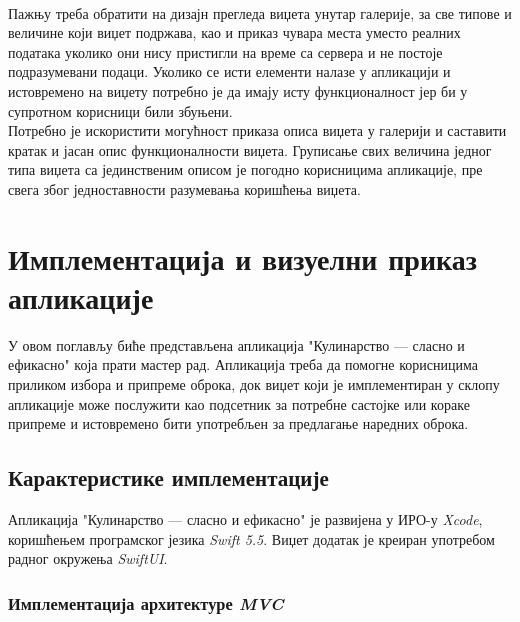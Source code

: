 \documentclass[12pt,oneside]{memoir}
\begin{document}
\\
\indent Пажњу треба обратити на дизајн прегледа виџета унутар галерије, за све типове и величине који виџет подржава, као и приказ чувара места уместо реалних података уколико они нису пристигли на време са сервера и не постоје подразумевани подаци. Уколико се исти елементи налазе у апликацији и истовремено на виџету потребно је да имају исту функционалност јер би у супротном корисници били збуњени. 
\\
\indent Потребно је искористити могућност приказа описа виџета у галерији и саставити кратак и јасан опис функционалности виџета. Груписање свих величина једног типа виџета са јединственим описом је погодно корисницима апликације, пре свега због једноставности разумевања коришћења виџета.

\chapter{Имплементација и визуелни приказ апликације}

\indent У овом поглављу биће представљена апликација "Кулинарство --- сласно и ефикасно" која прати мастер рад. Апликација треба да помогне корисницима приликом избора и припреме оброка, док виџет који је имплементиран у склопу апликације може послужити као подсетник за потребне састојке или кораке припреме и истовремено бити употребљен за предлагање наредних оброка.

\section{Карактеристике имплементације}

\indent Апликација "Кулинарство --- сласно и ефикасно" је развијена у ИРО-у \textit{Xcode}, коришћењем програмског језика \textit{Swift 5.5}. Виџет додатак је креиран употребом радног окружења \textit{SwiftUI}.

\subsection{Имплементација архитектуре \textit{MVC}}
\end{document}
